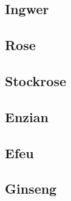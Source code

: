 \subsection{Ingwer}

\subsection{Rose}

\subsection{Stockrose}

\subsection{Enzian}

\subsection{Efeu}

\subsection{Ginseng}
